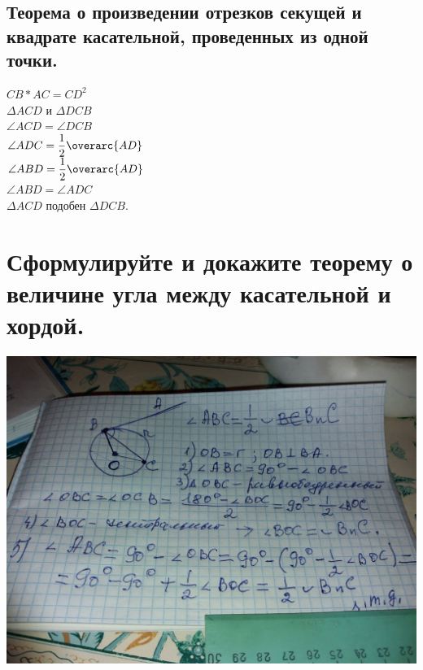 \documentclass[12pt, letterpaper]{article}
\begin{document}
\subsection{Теорема о произведении отрезков секущей и квадрате касательной, проведенных из одной точки.}
\textbf{$CB*AC=CD^2$ \\}
$\Delta ACD $ и $ \Delta DCB $ \\
$ \angle ACD = \angle DCB $ \\ 
$ \angle ADC  = \dfrac{1}{2} \overarc{AD} $ \\
$ \angle ABD  = \dfrac{1}{2} \overarc{AD} $ \\
$ \angle ABD  = \angle ADC $ \\
$ \Delta ACD $ подобен $ \Delta DCB $. \\


\section {Сформулируйте и докажите теорему о величине угла между касательной и хордой.}
\includegraphics[scale=0.3]{asset-2.png} \\
\end{document}
